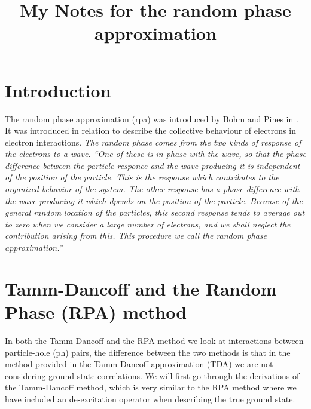 \documentclass[12pt,a4paper,english]{article}
\title{My Notes for the random phase approximation}
\begin{document}
\section{Introduction}
The random phase approximation (rpa) was introduced by Bohm and Pines in \cite{Bohm1951,Pines1952,Bohm1953}. It was introduced in relation to describe 
the collective behaviour of electrons in electron interactions.
\emph{The random phase comes from the two kinds of response of 
the electrons to a
wave. ``One of these is in phase with the wave, so that the phase difference
between the particle responce and the wave producing it is independent of
the position of the particle. This is the response which contributes to the 
organized behavior of the system. The other response has a phase difference
with the wave producing it which dpends on the position of the particle.
Because of the general random location of the particles, this second response 
tends to average out to zero when we consider a large number of electrons, and
we shall neglect the contribution arising from this. This procedure we call the
random phase approximation.}''\cite{Bohm1951}

\section{Tamm-Dancoff and the Random Phase (RPA) method}

In both the Tamm-Dancoff and the RPA method we look at interactions between
particle-hole (ph) pairs, the difference between the two methods is that in the method provided in the Tamm-Dancoff approximation (TDA) we are not considering 
ground state correlations. We will first go through the derivations of the Tamm-Dancoff method, which is very similar to the RPA method where we have included an de-excitation operator when describing the true ground state.




%

\end{document}
